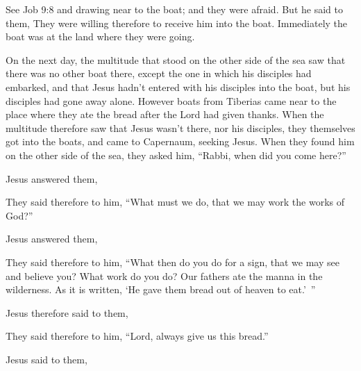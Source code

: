 {{See Job 9:8} and drawing near to the boat; and they were afraid.
But he said to them,
{}
{}
They were willing therefore to receive him into the boat. Immediately the boat was at the land where they were going.
\par }{\PP {}On the next day, the multitude that stood on the other side of the sea saw that there was no other boat there, except the one in which his disciples had embarked, and that Jesus hadn’t entered with his disciples into the boat, but his disciples had gone away alone.
However boats from Tiberias came near to the place where they ate the bread after the Lord had given thanks.
When the multitude therefore saw that Jesus wasn’t there, nor his disciples, they themselves got into the boats, and came to Capernaum, seeking Jesus.
When they found him on the other side of the sea, they asked him, “Rabbi, when did you come here?”
\par }{\PP {}Jesus answered them,
{}
\par }{\PP {}They said therefore to him, “What must we do, that we may work the works of God?”
\par }{\PP {}Jesus answered them,
{}
\par }{\PP {}They said therefore to him, “What then do you do for a sign, that we may see and believe you? What work do you do?
Our fathers ate the manna in the wilderness. As it is written, ‘He gave them bread out of heaven to eat.’ ”
\par }{\PP {}Jesus therefore said to them,
{}
\par }{\PP {}They said therefore to him, “Lord, always give us this bread.”
\par }{\PP {}Jesus said to them,
}
